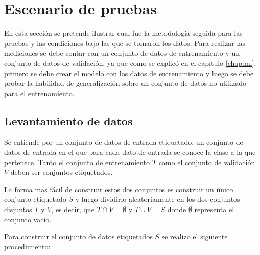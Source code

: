 \documentclass[a4paper, 11pt, oneside]{report}
\begin{document}
\section{Escenario de pruebas}
\label{sect:testEnvironment}

En esta sección se pretende ilustrar cual fue la metodología seguida para las pruebas y las condiciones bajo las que se tomaron los datos. Para realizar las mediciones se debe contar con un conjunto de datos de entrenamiento y un conjunto de datos de validación, ya que como se explicó en el capítulo \ref{chap:ml}, primero se debe crear el modelo con los datos de entrenamiento y luego se debe probar la habilidad de generalización sobre un conjunto de datos no utilizado para el entrenamiento.

\subsection{Levantamiento de datos}

Se entiende por un conjunto de datos de entrada etiquetado, un conjunto de datos de entrada en el que para cada dato de entrada se conoce la clase a la que pertenece. Tanto el conjunto de entrenamiento $T$ como el conjunto de validación $V$ deben ser conjuntos etiquetados.

La forma mas fácil de construir estos dos conjuntos es construir un único conjunto etiquetado $S$ y luego dividirlo aleatoriamente en los dos conjuntos disjuntos $T$ y $V$, es decir, que $T \cap V = \emptyset$ y $T \cup V = S$ donde $\emptyset$ representa el conjunto vacío.

Para construir el conjunto de datos etiquetados $S$ se realizo el siguiente procedimiento:
\end{document}
